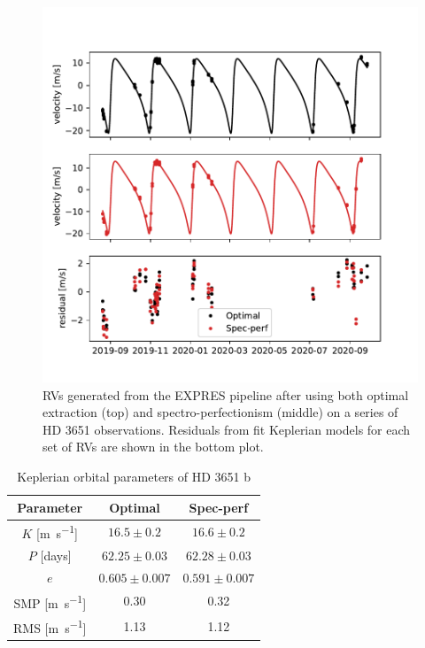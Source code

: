 \begin{figure}
    \centering
    \includegraphics[width=\textwidth]{figures-5/spec-perf-rvs.pdf}
    \caption[Spectro-perfectionism vs. optimal extraction -- HD 3651 radial velocities]{RVs generated from the EXPRES pipeline after using both optimal extraction (top) and spectro-perfectionism (middle) on a series of HD 3651 observations. Residuals from fit Keplerian models for each set of RVs are shown in the bottom plot.}
    \label{fig:spec-perf-rvs}
\end{figure}

\begin{table}
    \centering
    \begin{tabular}{c|cc}
        \hline
        \hline
        Parameter & Optimal & Spec-perf \\
        \hline
        $K$ [\si{\meter\per\second}] & $16.5 \pm 0.2$ & $16.6 \pm 0.2$ \\
        $P$ [days] & $62.25 \pm 0.03$ & $62.28 \pm 0.03$ \\
        $e$ & $0.605 \pm 0.007$ & $0.591 \pm 0.007$ \\
        SMP [\si{\meter\per\second}] & 0.30 & 0.32 \\
        RMS [\si{\meter\per\second}] & 1.13 & 1.12 \\
    \end{tabular}
    \caption[HD 3651 -- Keplerian orbital parameter comparison (extraction method)]{Keplerian orbital parameters of HD 3651 b}
    \label{tab:spec-perf-rvs}
\end{table}

